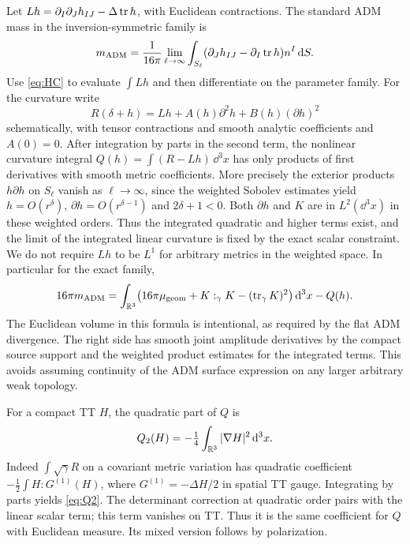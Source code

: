 Let \(Lh=\partial_I\partial_Jh_{IJ}-\Delta\operatorname{tr} h\), with Euclidean contractions. The standard ADM mass in the inversion-symmetric family is
\[
 m_{\mathrm{ADM}}=\frac1{16\pi}\lim_{\ell\to\infty}
        \int_{S_\ell}(\partial_J h_{IJ}-\partial_I\operatorname{tr} h)n^I\,\mathrm d S .
\]
Use \eqref{eq:HC} to evaluate \(\int Lh\) and then differentiate on the parameter family. For the curvature write
\[
       R(\delta+h)=Lh+A(h)\partial^2h+B(h)(\partial h)^2
\]
schematically, with tensor contractions and smooth analytic coefficients and \(A(0)=0\). After integration by parts in the second term, the nonlinear curvature integral \(Q(h)=\int(R-Lh)\,\dd^3x\) has only products of first derivatives with smooth metric coefficients. More precisely the exterior products \(h\partial h\) on \(S_\ell\) vanish as \(\ell\to\infty\), since the weighted Sobolev estimates yield \(h=O(r^\delta)\), \(\partial h=O(r^{\delta-1})\) and \(2\delta+1<0\). Both \(\partial h\) and \(K\) are in \(L^2(\dd^3x)\) in these weighted orders. Thus the integrated quadratic and higher terms exist, and the limit of the integrated linear curvature is fixed by the exact scalar constraint. We do not require \(Lh\) to be \(L^1\) for arbitrary metrics in the weighted space. In particular for the exact family,
\begin{equation}
 16\pi m_{\mathrm{ADM}}
    =\int_{\mathbb R^3}\bigl(16\pi\mu_{\rm geom}
                 +K:_{\gamma}K-(\operatorname{tr}_\gamma K)^2\bigr)\,\mathrm d^3x-Q(h).
 \label{eq:intadm}
\end{equation}
The Euclidean volume in this formula is intentional, as required by the flat ADM divergence. The right side has smooth joint amplitude derivatives by the compact source support and the weighted product estimates for the integrated terms. This avoids assuming continuity of the ADM surface expression on any larger arbitrary weak topology.

For a compact TT \(H\), the quadratic part of \(Q\) is
\begin{equation}
          Q_2(H)=-\tfrac14\int_{\mathbb R^3}|\nabla H|^2\,\mathrm d^3x .
          \label{eq:Q2}
\end{equation}
Indeed \(\int\sqrt{\gamma}R\) on a covariant metric variation has quadratic coefficient \(-\tfrac12\int H:G^{(1)}(H)\), where \(G^{(1)}=-\Delta H/2\) in spatial TT gauge. Integrating by parts yields \eqref{eq:Q2}. The determinant correction at quadratic order pairs with the linear scalar term; this term vanishes on TT. Thus it is the same coefficient for \(Q\) with Euclidean measure. Its mixed version follows by polarization.

